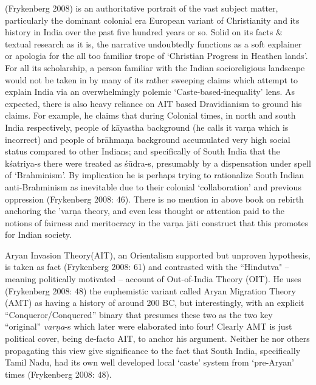 (Frykenberg 2008) is an authoritative portrait of the vast subject matter, particularly the dominant colonial era European variant of Christianity and its history in India over the past five hundred years or so. Solid on its facts \& textual research as it is, the narrative undoubtedly functions as a soft explainer or apologia for the all too familiar trope of ‘Christian Progress in Heathen lands’. For all its scholarship, a person familiar with the Indian socioreligious landscape would not be taken in by many of its rather sweeping claims which attempt to explain India via an overwhelmingly polemic ‘Caste-based-inequality’ lens. As expected, there is also heavy reliance on AIT based Dravidianism to ground his claims. For example, he claims that during Colonial times, in north and south India respectively, people of kāyastha background (he calls it varṇa which is incorrect) and people of brāhmaṇa background accumulated very high social status compared to other Indians; and specifically of South India that the kśatriya-s there were treated as śūdra-s, presumably by a dispensation under spell of ‘Brahminism’. By implication he is perhaps trying to rationalize South Indian anti-Brahminism as inevitable due to their colonial ‘collaboration’ and previous oppression (Frykenberg 2008: 46). There is no mention in above book on rebirth anchoring the 'varṇa theory, and even less thought or attention paid to the notions of fairness and meritocracy in the varṇa jāti construct that this promotes for Indian society.

Aryan Invasion Theory(AIT), an Orientalism supported but unproven hypothesis, is taken as fact (Frykenberg 2008: 61) and contrasted with the “Hindutva" – meaning politically motivated – account of Out-of-India Theory (OIT). He uses (Frykenberg 2008: 48) the euphemistic variant called Aryan Migration Theory (AMT) as having a history of around 200 BC, but interestingly, with an explicit “Conqueror/Conquered” binary that presumes these two as the two key “original” \textit{varṇa}-s which later were elaborated into four! Clearly AMT is just political cover, being de-facto AIT, to anchor his argument. Neither he nor others propagating this view give significance to the fact that South India, specifically Tamil Nadu, had its own well developed local ‘caste’ system from ‘pre-Aryan’ times (Frykenberg 2008: 48).

